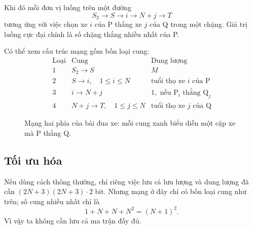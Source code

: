 \documentclass[11pt]{article}
\begin{document}
Khi đó mỗi đơn vị luồng trên một đường
\[
  S_2\to S\to i\to N+j\to T
\]
tương ứng với việc chọn xe \(i\) của P thắng xe \(j\) của Q trong một chặng.
Giá trị luồng cực đại chính là số chặng thắng nhiều nhất của P.

Có thể xem cấu trúc mạng gồm bốn loại cung:
\[
\begin{array}{c|l|l}
\text{Loại} & \text{Cung} & \text{Dung lượng}\\ \hline
1 & S_2\to S & M\\
2 & S\to i,\quad 1\le i\le N & \text{tuổi thọ xe }i\text{ của P}\\
3 & i\to N+j & 1,\text{ nếu P}_i\text{ thắng Q}_j\\
4 & N+j\to T,\quad 1\le j\le N & \text{tuổi thọ xe }j\text{ của Q}
\end{array}
\]

\begin{figure}[ht]
\centering
{}
\caption{Mạng hai phía của bài đua xe: mỗi cung xanh biểu diễn một cặp xe mà P thắng Q.}
\end{figure}

\subsection{Tối ưu hóa}

Nếu dùng cách thông thường, chỉ riêng việc lưu cả lưu lượng và dung lượng đã
cần \((2N+3)(2N+3)\cdot 2\) bit. Nhưng mạng ở đây chỉ có bốn loại cung như
trên; số cung nhiều nhất chỉ là
\[
  1+N+N+N^2=(N+1)^2.
\]
Vì vậy ta không cần lưu cả ma trận đầy đủ.
\end{document}
